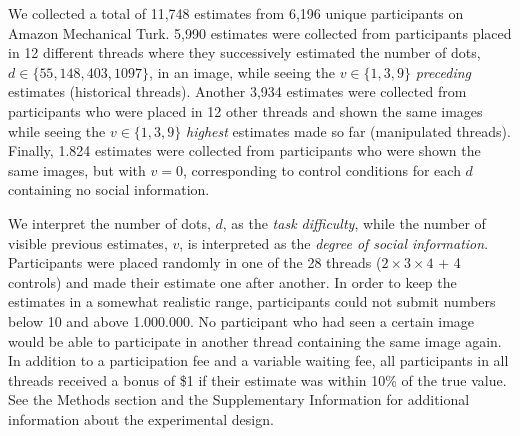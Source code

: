 \documentclass[9pt,a4paper,twocolumn,lineno]{article}
\begin{document}
We collected a total of 11,748 estimates from 6,196 unique participants on Amazon Mechanical Turk. 5,990 estimates were collected from participants placed in 12 different threads where they successively estimated the number of dots, $d \in \{55,148,403,1097\}$, in an image, while seeing the $v \in \{1,3,9\}$ \textit{preceding} estimates (historical threads). Another 3,934 estimates were collected from participants who were placed in 12 other threads and shown the same images while seeing the $v \in \{1,3,9\}$ \textit{highest} estimates made so far (manipulated threads). Finally, 1.824 estimates were collected from participants who were shown the same images, but with $v=0$, corresponding to control conditions for each $d$ containing no social information.

We interpret the number of dots, $d$, as the \textit{task difficulty}, while the number of visible previous estimates, $v$, is interpreted as the \textit{degree of social information}. Participants were placed randomly in one of the 28 threads ($2 \times 3 \times 4$ + 4 controls)  and made their estimate one after another. In order to keep the estimates in a somewhat realistic range, participants could not submit numbers below 10 and above 1.000.000. No participant who had seen a certain image would be able to participate in another thread containing the same image again. In addition to a participation fee and a variable waiting fee, all participants in all threads received a bonus of \$1 if their estimate was within 10\% of the true value. See the Methods section and the Supplementary Information for additional information about the experimental design.
\end{document}
